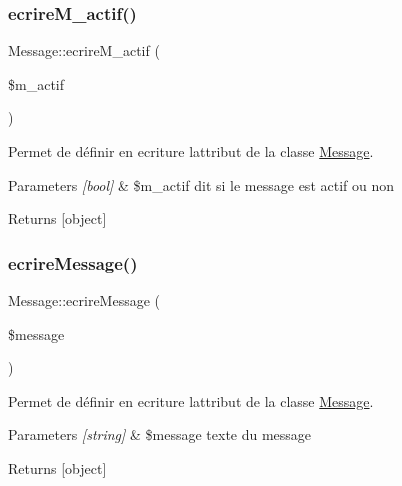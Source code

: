 \subsubsection{\texorpdfstring{ecrire\+M\+\_\+actif()}{ecrireM\_actif()}}
{\footnotesize\ttfamily Message\+::ecrire\+M\+\_\+actif (\begin{DoxyParamCaption}\item[{}]{\$m\+\_\+actif }\end{DoxyParamCaption})}



Permet de définir en ecriture l\textquotesingle{}attribut de la classe \hyperlink{class_message}{Message}. 


\begin{DoxyParams}{Parameters}
{\em \mbox{[}bool\mbox{]}} & \$m\+\_\+actif dit si le message est actif ou non \\
\hline
\end{DoxyParams}
\begin{DoxyReturn}{Returns}
\mbox{[}object\mbox{]} 
\end{DoxyReturn}
\mbox{\label{class_message_a1f3fc7d1b51a030c0b52d546cd8a8e5b}} 
\subsubsection{\texorpdfstring{ecrire\+Message()}{ecrireMessage()}}
{\footnotesize\ttfamily Message\+::ecrire\+Message (\begin{DoxyParamCaption}\item[{}]{\$message }\end{DoxyParamCaption})}



Permet de définir en ecriture l\textquotesingle{}attribut de la classe \hyperlink{class_message}{Message}. 


\begin{DoxyParams}{Parameters}
{\em \mbox{[}string\mbox{]}} & \$message texte du message \\
\hline
\end{DoxyParams}
\begin{DoxyReturn}{Returns}
\mbox{[}object\mbox{]} 
\end{DoxyReturn}
\mbox{\label{class_message_a7536890bce46a2ee4f6927f4d72db97e}} 
